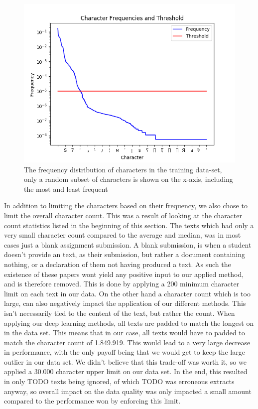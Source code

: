 \begin{figure}[htb]
    \centering
    \includegraphics[scale=.8]{./pictures/data/character_frequencies.png}
    \caption{The frequency distribution of characters in the training data-set,
        only a random subset of characters is shown on the x-axis, including the
        most and least frequent}
    \label{fig:character_frequencies}
\end{figure}

In addition to limiting the characters based on their frequency, we also chose
to limit the overall character count. This was a result of looking at the
character count statistics listed in the beginning of this section. The texts
which had only a very small character count compared to the average and median,
was in most cases just a blank assignment submission. A blank submission, is
when a student doesn't provide an text, as their submission, but rather a
document containing nothing, or a declaration of them not having produced a
text. As such the existence of these papers wont yield any positive input to
our applied method, and is therefore removed. This is done by applying a 200
minimum character limit on each text in our data. On the other hand a character
count which is too large, can also negatively impact the application of our
different methods. This isn't necessarily tied to the content of the text, but
rather the count. When applying our deep learning methods, all texts are padded
to match the longest on in the data set. This means that in our case, all texts
would have to padded to match the character count of 1.849.919. This would lead
to a very large decrease in performance, with the only payoff being that we
would get to keep the large outlier in our data set. We didn't believe that this
trade-off was worth it, so we applied a 30.000 character upper limit on our data
set. In the end, this resulted in only TODO texts being ignored, of which TODO
was erroneous extracts anyway, so overall impact on the data quality was only
impacted a small amount compared to the performance won by enforcing this limit.

